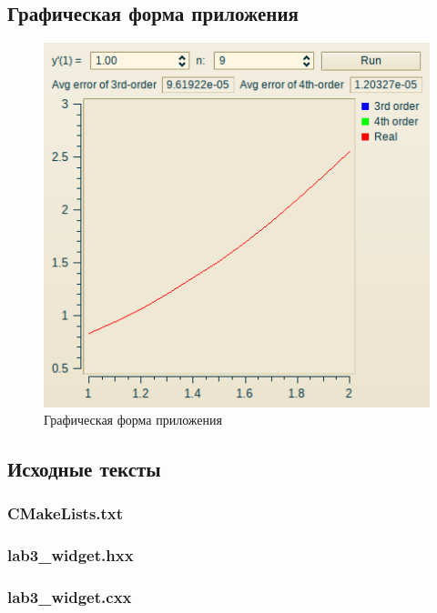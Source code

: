 \documentclass[a4paper,12pt,notitlepage,headsepline,pdftex]{scrartcl}
\begin{document}
  \subsection{Графическая форма приложения}
    \begin{figure}[h!]
      \begin{center}
        \includegraphics[scale=0.86]{scr.png}
      \end{center}
      \caption{Графическая форма приложения}
      \label{fig:gui}
    \end{figure}
  \subsection{Исходные тексты}
    \subsubsection{CMakeLists.txt}
      
    \subsubsection{lab3\_widget.hxx}
      
    \subsubsection{lab3\_widget.cxx}
      
\end{document}
